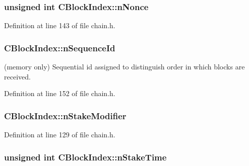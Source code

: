 \subsubsection[{n\+Nonce}]{\setlength{\rightskip}{0pt plus 5cm}unsigned int C\+Block\+Index\+::n\+Nonce}\label{class_c_block_index_a5e0a648ed1df8da171eba636d5ebef01}


Definition at line 143 of file chain.\+h.

\hypertarget{class_c_block_index_a4a679af5f7924cc594b8131371b21e54}{}
\subsubsection[{n\+Sequence\+Id}]{ C\+Block\+Index\+::n\+Sequence\+Id}\label{class_c_block_index_a4a679af5f7924cc594b8131371b21e54}


(memory only) Sequential id assigned to distinguish order in which blocks are received. 



Definition at line 152 of file chain.\+h.

\hypertarget{class_c_block_index_a2aa226c04d79a4d932ed6eb0abd02cbe}{}
\subsubsection[{n\+Stake\+Modifier}]{ C\+Block\+Index\+::n\+Stake\+Modifier}\label{class_c_block_index_a2aa226c04d79a4d932ed6eb0abd02cbe}


Definition at line 129 of file chain.\+h.

\hypertarget{class_c_block_index_ae6870336a5bf237680502fa067262af8}{}
\subsubsection[{n\+Stake\+Time}]{\setlength{\rightskip}{0pt plus 5cm}unsigned int C\+Block\+Index\+::n\+Stake\+Time}\label{class_c_block_index_ae6870336a5bf237680502fa067262af8}


